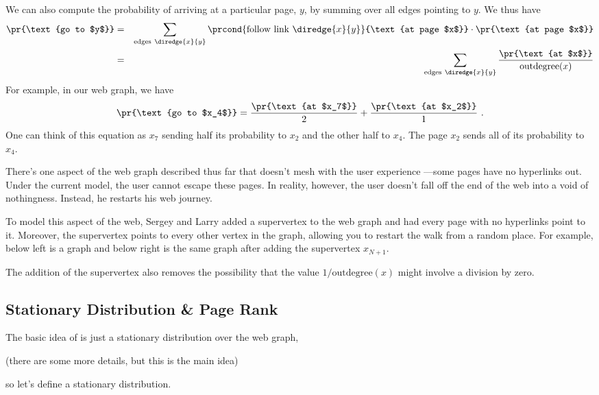 We can also compute the probability of arriving at a particular page, $y$,
by summing over all edges pointing to $y$.  We thus have
\begin{eqnarray}
  \pr{\text{go to $y$}} &=&  \sum_{\text{edges}\ \diredge{x}{y}}
  \prcond{\text{follow link}\ \diredge{x}{y}}{\text{at page $x$}} \cdot
  \pr{\text{at page $x$}} \nonumber\\
  &=& \sum_{\text{edges}\ \diredge{x}{y}} \frac{\pr{\text{at
      $x$}}}{\text{outdegree}(x)} \label{LN12:stepprob}
\end{eqnarray}
For example, in our web graph, we have
\[ \pr{\text{go to $x_4$}} = \frac{\pr{\text{at $x_7$}}}{2} +
\frac{\pr{\text{at $x_2$}}}{1} \ .
\]
One can think of this equation as $x_7$ sending half its probability to
$x_2$ and the other half to $x_4$. The page $x_2$ sends all of its
probability to $x_4$.

There's one aspect of the web graph described thus far that doesn't mesh
with the user experience ---some pages have no hyperlinks out.  Under the
current model, the user cannot escape these pages.  In reality, however,
the user doesn't fall off the end of the web into a void of nothingness.
Instead, he restarts his web journey.

To model this aspect of the web, Sergey and Larry added a supervertex to the
web graph and had every page with no hyperlinks point to it.  Moreover,
the supervertex points to every other vertex in the graph, allowing you to
restart the walk from a random place.  For example, below left is a graph
and below right is the same graph after adding the supervertex $x_{N+1}$.

\bigskip\centerline{
  \hspace{2cm}
}\bigskip

The addition of the supervertex also removes the possibility that the value
$1/\text{outdegree}(x)$ might involve a division by zero.

\subsection{Stationary Distribution \& Page Rank}

The basic idea of  is just a stationary distribution over
the web graph,
\begin{editingnotes}
(there are some more details, but this is the main idea)
\end{editingnotes}
so let's define a stationary distribution.

